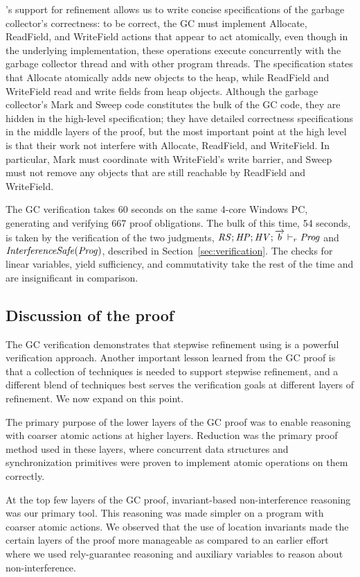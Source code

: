 \civl's support for refinement allows us to write concise specifications of the garbage collector's correctness:
to be correct, the GC must implement Allocate, ReadField, and WriteField actions that appear to act atomically,
even though in the underlying implementation,
these operations execute concurrently with the garbage collector thread and with other program threads.
The specification states that Allocate atomically adds new objects to the heap,
while ReadField and WriteField read and write fields from heap objects.
Although the garbage collector's Mark and Sweep code constitutes the bulk of the GC code,
they are hidden in the high-level specification;
they have detailed correctness specifications in the middle layers of the proof,
but the most important point at the high level is that their work not interfere with Allocate, ReadField, and WriteField.
In particular, Mark must coordinate with WriteField's write barrier,
and Sweep must not remove any objects that are still reachable by ReadField and WriteField.

The GC verification takes 60 seconds on the same 4-core Windows PC, generating and verifying 667 proof obligations. 
The bulk of this time, 54 seconds, is taken by the verification of the two judgments,
$\mathit{RS};\mathit{HP};\mathit{HV};\overrightarrow{b} \vdash_r \mathit{Prog}$ and $\mathit{InterferenceSafe}(\mathit{Prog})$, described in Section~\ref{sec:verification}.
The checks for linear variables, yield sufficiency, and commutativity take the rest of the time and are insignificant in comparison.

\subsection{Discussion of the proof}
The GC verification demonstrates that stepwise refinement using \civl is a
powerful verification approach. 
Another important lesson learned from the GC proof is that a collection
of techniques is needed to support stepwise refinement, and a different blend of
techniques best serves the verification goals at different layers of refinement. 
We now expand on this point. 

The primary purpose of the lower layers of the GC proof was to enable
reasoning with coarser atomic actions at higher layers. 
Reduction was the primary proof method used in these layers, where
concurrent data structures and synchronization primitives were proven
to implement atomic operations on them correctly. 

At the top few layers of the GC proof, invariant-based
non-interference reasoning was our primary tool. 
This reasoning was made simpler on a program with coarser
atomic actions. 
We observed that the use
of location invariants made the certain layers of the proof more
manageable as compared to an earlier effort where we used
rely-guarantee reasoning and auxiliary variables to reason about
non-interference.  

